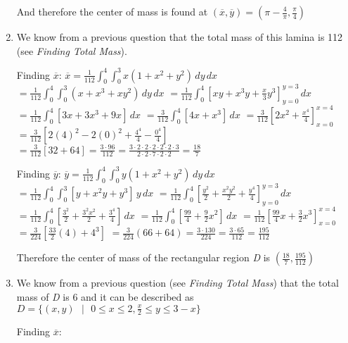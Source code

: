\begin{Answer}[ref = c_of_m]
\begin{enumerate}
And therefore the center of mass is found at $\left( \overline{x}, \overline{y}
\right) = \left( \pi - \frac{4}{\pi}, \frac{\pi}{4} \right)$

\item We know from a previous question that the total mass of this lamina is 
112 (see \textit{Finding Total Mass}). 

Finding $\overline{x}$: $\overline{x} = \frac{1}{112} \int_0^4 \int_0^3 x 
\left( 1 + x^2 + y^2 \right)\,dy\,dx$ 
$= \frac{1}{112} \int_0^4 \int_0^3 \left(x + x^3 + xy^2 \right)\,dy\,dx$ 
$= \frac{1}{112} \int_0^4 \left[ xy + x^3y + \frac{x}{3}y^3 \right]_{y = 0}^{y 
= 3} \,dx$ 
$= \frac{1}{112} \int_0^4 \left[3x + 3x^3 + 9x \right]\,dx$ 
$= \frac{3}{112} \int_0^4 \left[ 4x + x^3 \right]\,dx$ 
$= \frac{3}{112} \left[ 2x^2 + \frac{x^4}{4} \right]_{x = 0}^{x = 4}$ 
$= \frac{3}{112} \left[ 2(4)^2 - 2(0)^2 + \frac{4^4}{4} - \frac{0^4}{4} 
\right]$ 
$= \frac{3}{112} \left[ 32 + 64 \right] = \frac{3 \cdot 96}{112} = \frac{3 
\cdot 2 \cdot 2 \cdot 2 \cdot 2 \cdot 2 \cdot 3}{2 \cdot 2 \cdot 7 \cdot 2 
\cdot 2} = \frac{18}{7}$

Finding $\overline{y}$: $\overline{y} = \frac{1}{112} \int_0^4 \int_0^3 y 
\left( 1 + x^2 + y^2 \right)\,dy\,dx$ 
$= \frac{1}{112} \int_0^4 \int_0^3 \left[ y + x^2y + y^3 \right]\,y\,dx$ 
$= \frac{1}{112} \int_0^4 \left[ \frac{y^2}{2} + \frac{x^2y^2}{2} + \frac{y^4}{
4} \right]_{y = 0}^{y = 3} \,dx$ 
$= \frac{1}{112} \int_0^4 \left[ \frac{3^2}{2} + \frac{3^2x^2}{2} + \frac{3^4}{
4} \right]\,dx$ 
$= \frac{1}{112} \int_0^4 \left[ \frac{99}{4} + \frac{9}{2}x^2 \right] \,dx$ 
$= \frac{1}{112} \left[ \frac{99}{4}x + \frac{3}{2}x^3 \right]_{x = 0}^{x = 4}$ 
$= \frac{3}{224} \left[\frac{33}{2}(4) + 4^3 \right]$ 
$= \frac{3}{224} \left( 66 + 64 \right) = \frac{3 \cdot 130}{224} = \frac{3 
\cdot 65}{112} = \frac{195}{112}$

Therefore the center of mass of the rectangular region \textit{D} is $\left(
\frac{18}{7}, \frac{195}{112} \right)$

\item We know from a previous question (see \textit{Finding Total Mass}) that 
the total mass of \textit{D} is 6 and it can be described as $\textit{D} = \{ (
x, y) \text{ }|\text{ } 0 \leq x \leq 2, \frac{x}{2} \leq y \leq 3 - x\}$

Finding $\overline{x}$:


\end{enumerate}
\end{Answer}
